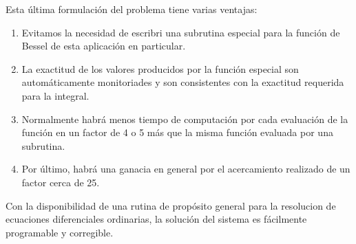 Esta última formulación del problema tiene varias ventajas:
\begin{enumerate}
	\item Evitamos la necesidad de escribri una subrutina especial para la
función de Bessel de esta aplicación en particular.
	\item La exactitud de los valores producidos por la función especial son
automáticamente monitoriades y son consistentes con la exactitud requerida
para la integral.
	\item Normalmente habrá menos tiempo de computación por cada evaluación de
la función en un factor de 4 o 5 más que la misma función evaluada por una
subrutina.
	\item Por último, habrá una ganacia en general por el acercamiento
realizado de un factor cerca de 25.
\end{enumerate}

Con la disponibilidad de una rutina de propósito general para la resolucion de
ecuaciones diferenciales ordinarias, la solución del sistema es fácilmente
programable y corregible.



